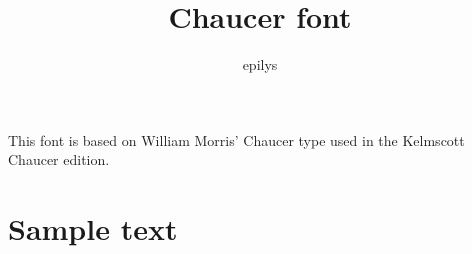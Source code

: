 \documentclass{article}
\title{Chaucer font}
\author{epilys}
\begin{document}
\maketitle
This font is based on William Morris' Chaucer type used in the Kelmscott Chaucer edition.

\section{Sample text}
\kant         %
\end{document}
